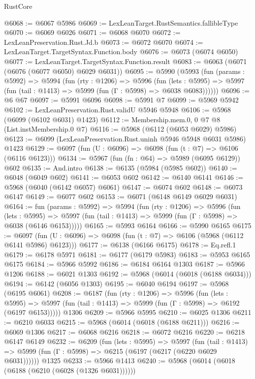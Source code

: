 \begin{lexlean}{RustCore}
\begin{coremodule}
@6068 := @6067 @5986
@6069 := LexLeanTarget.RustSemantics.fallibleType
@6070 := @6069 @6026
@6071 := @6068 @6070
@6072 := LexLeanPreservation.Rust.Jd.b
@6073 := @6072 @6070
@6074 := LexLeanTarget.TargetSyntax.Function.body
@6076 := @6073 (@6074 @6050)
@6077 := LexLeanTarget.TargetSyntax.Function.result
@6083 := @6063 (@6071 (@6076 (@6077 @6050) @6029 @6031))
@6095 := @5990
    (@5993
      (fun (params : @5992) =>
      @5994
        (fun (rty : @1206) =>
        @5996
          (fun (lets : @5995) =>
          @5997 (fun (tail : @1413) => @5999 (fun (Γ : @5998) => @6038 @6083))))))
@6096 := @6 @67
@6097 := @5991 @6096
@6098 := @5991 @7
@6099 := @5969 @5942
@6102 := LexLeanPreservation.Rust.validU @5946 @5948
@6106 := @5968 (@6099 (@6102 @6031) @1423)
@6112 := Membership.mem.{0, 0} @7 @8 (List.instMembership.{0} @7)
@6116 := @5968 (@6112 (@6053 @6029) @5986)
@6123 := @6099 (LexLeanPreservation.Rust.uninh @5946 @5948 @6031 @5986) @1423
@6129 := @6097 (fun (U : @6096) => @6098 (fun (t : @7) => @6106 (@6116 @6123)))
@6134 := @5967 (fun (fn : @64) => @5989 (@6095 @6129)) @602
@6135 := And.intro
@6138 := @6135 (@5984 (@5985 @602))
@6140 := @6048 (@6049 @602)
@6141 := @6053 @602
@6142 := @6140 @6141
@6146 := @5968 (@6040 (@6142 @6057) @6061)
@6147 := @6074 @602
@6148 := @6073 @6147
@6149 := @6077 @602
@6153 := @6071 (@6148 @6149 @6029 @6031)
@6164 := fun (params : @5992) =>
  @5994
    (fun (rty : @1206) =>
    @5996
      (fun (lets : @5995) =>
      @5997 (fun (tail : @1413) => @5999 (fun (Γ : @5998) => @6038 (@6146 @6153)))))
@6165 := @5993 @6164
@6166 := @5990 @6165
@6175 := @6097 (fun (U : @6096) => @6098 (fun (t : @7) => @6106 (@5968 (@6112 @6141 @5986) @6123)))
@6177 := @6138 (@6166 @6175)
@6178 := Eq.refl.{1}
@6179 := @6178 @5971
@6181 := @6177 (@6179 @5983)
@6183 := @5953 @6165 @6175
@6184 := @5966 @5992
@6186 := @6184 @6164 @1303
@6187 := @5966 @1206
@6188 := @6021 @1303
@6192 := @5968 (@6014 (@6018 (@6188 @6034)))
@6194 := @6142 (@6056 @1303)
@6195 := @6040 @6194
@6197 := @5968 (@6195 @6061)
@6208 := @6187
    (fun (rty : @1206) =>
    @5996
      (fun (lets : @5995) =>
      @5997 (fun (tail : @1413) => @5999 (fun (Γ : @5998) => @6192 (@6197 @6153)))))
    @1306
@6209 := @5966 @5995
@6210 := @6025 @1306
@6211 := @6210 @6033
@6215 := @5968 (@6014 (@6018 (@6188 @6211)))
@6216 := @6069 @1306
@6217 := @6068 @6216
@6218 := @6072 @6216
@6220 := @6218 @6147 @6149
@6232 := @6209
    (fun (lets : @5995) =>
    @5997
      (fun (tail : @1413) => @5999 (fun (Γ : @5998) => @6215 (@6197 (@6217 (@6220 @6029 @6031))))))
    @1325
@6233 := @5966 @1413
@6240 := @5968 (@6014 (@6018 (@6188 (@6210 (@6028 (@1326 @6031))))))

\end{coremodule}
\end{lexlean}
